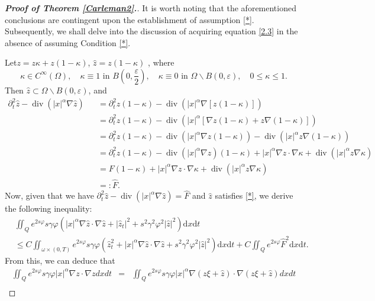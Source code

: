 \documentclass[11pt]{article}
\numberwithin{equation}{section}
\def\pt{\partial}
\def\vp{\varphi}
\def\bf{\textbf}
\def\pt{\partial}
\def\om{\omega}
\def\Om{\Omega}
\def\al{\alpha}
\def\ga{\gamma}
\def\ts{\times}
\def\df{\mathrm d}
\DeclareMathOperator{\Div}{div}
\begin{document}
\begin{proof}[{\rm \bf { Proof of  Theorem \ref{Carleman2}.}}]
			
			It is worth noting that the aforementioned conclusions are contingent upon the establishment of assumption \ref{*}. Subsequently, we shall delve into the discussion of acquiring equation \eqref{2.3} in the absence of assuming Condition \ref{*}.
			
			Let$z=z\kappa + z(1-\kappa)$, $\hat{z}=z(1-\kappa)$ , where
			$$
			\kappa \in C^\infty (\Omega), \quad \kappa \equiv 1 \mbox{ in } B\left(0,\frac{\varepsilon }{2}\right), \quad \kappa \equiv 0 \mbox{ in } \Om\backslash B(0,\varepsilon ), \quad 0\le \kappa \le 1.
			$$
			Then   $\hat{z} \subset \Om\backslash B(0,\varepsilon )$, and
			\begin{eqnarray*}
				\pt_t^2 \hat{z}-\Div\left(|x|^\alpha \nabla \hat{z}\right)
				&&=  \pt_t^2 z(1-\kappa)-\Div\left(|x|^\alpha \nabla\left[  z(1-\kappa)\right] \right)\\
				&&= \pt_t^2 z(1-\kappa)-\Div\left(|x|^\alpha \left[ \nabla z(1-\kappa) + z \nabla (1-\kappa) \right] \right)\\
				&&= \pt_t^2 z(1-\kappa)-\Div\left(|x|^\alpha \nabla z(1-\kappa)\right) -\Div\left(|x|^\alpha z \nabla (1-\kappa)  \right)\\
				&&= \pt_t^2 z(1-\kappa)-\Div\left(|x|^\alpha \nabla z \right)(1-\kappa) + |x|^\alpha \nabla z \cdot \nabla \kappa + \Div\left(|x|^\alpha z \nabla \kappa  \right)\\
				&&= F(1-\kappa) + |x|^\alpha \nabla z \cdot \nabla \kappa + \Div\left(|x|^\alpha z \nabla \kappa  \right)\\
				&&=:\hat{F}.
			\end{eqnarray*}
			Now, given that we have $\pt_t^2 \hat{z}-\Div\left(|x|^\alpha \nabla \hat{z}\right)=\hat{F}$ and $\hat{z}$
			satisfies \eqref{*}, we derive the following inequality:
			\begin{equation}\label{4.6}
				\begin{split}
					&\iint_Qe^{2s\vp}s\ga \vp \left(|x|^\al \nabla \hat{z}\cdot \nabla \hat{z}+|\hat{z}_t|^2+s^2\ga^2\vp^2|\hat{z}|^2\right)\df x\df t\\
					&\leq C\iint_{\om\ts (0,T)}e^{2s\vp}s\ga \vp\left( \hat{z}_t^2+|x|^\al \nabla \hat{z}\cdot \nabla \hat{z} +s^2\ga^2\vp^2|\hat{z}|^2 \right)\df x\df t+C\iint_Qe^{2s\vp} \hat{F}^2\df x\df t.
				\end{split}
			\end{equation}
			From this, we can deduce that
			\begin{eqnarray*}
				\iint_Qe^{2s\vp}s\ga \vp |x|^\al \nabla z\cdot \nabla z dx dt
				&=&\iint_Qe^{2s\vp}s\ga \vp |x|^\al \nabla \left( z\xi + \hat{z}\right) \cdot \nabla \left( z\xi + \hat{z}\right) dx dt\\

\end{eqnarray*}
\end{proof}
\end{document}
